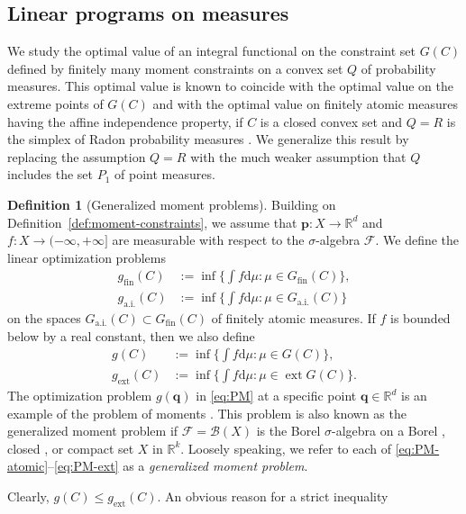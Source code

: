 \documentclass[a4paper,11pt,reqno]{amsart}
\numberwithin{equation}{section}
\theoremstyle{plain}
\theoremstyle{definition}
\newtheorem{definition}[theorem]{Definition}
\newcommand{\bp}{\mathbf{p}}
\newcommand{\bq}{\mathbf{q}}
\newcommand{\cB}{\mathcal{B}} %
\newcommand{\cF}{\mathcal{F}} %
\newcommand{\dd}{\mathrm{d}} %
\newcommand{\R}{\mathbb{R}} %
\DeclareMathOperator{\ext}{ext} %
\newcommand\ait{\mathrm{a.i.}}
\newcommand\extt{\mathrm{ext}}
\newcommand\fint{\mathrm{fin}}
\begin{document}
\subsection{Linear programs on measures}
\label{sec:measure-lp}
% 
We study the optimal value of an integral functional on the constraint set $G(C)$ 
defined by finitely many moment constraints on a convex set $Q$ of probability 
measures. This optimal value is known to coincide with the optimal value on the 
extreme points of $G(C)$ and with the optimal value on finitely atomic measures 
having the affine independence property, if $C$ is a closed convex set and $Q=R$ 
is the simplex of Radon probability measures \cite{weizsaecker-winkler80,winkler88}. 
We generalize this result by replacing the assumption $Q=R$ with the much weaker
assumption that $Q$ includes the set $P_1$ of point measures.
\par
%
\begin{definition}[Generalized moment problems]\label{def:moment-problems}
Building on Definition~\ref{def:moment-constraints}, we assume that $\bp\colon X\to\R^d$ 
and $f\colon X\to(-\infty,+\infty]$ are measurable with respect to the $\sigma$-algebra 
$\cF$. We define the linear optimization problems
\begin{align}
\label{eq:PM-atomic}
g_\fint(C) & \textstyle
:= \inf\{ \int f\dd\mu : \mu\in G_\fint(C) \},\\
%
\label{eq:PM-aff-ind}
g_\ait(C) & \textstyle
:= \inf\{ \int f\dd\mu : \mu\in G_\ait(C) \}
\end{align}
on the spaces $G_\ait(C)\subset G_\fint(C)$ of finitely atomic measures. If $f$ is 
bounded below by a real constant, then we also define
\begin{align}
\label{eq:PM}
g(C) & \textstyle
:= \inf\{ \int f\dd\mu : \mu\in G(C) \},\\
%
\label{eq:PM-ext}
g_\extt(C) & \textstyle
:= \inf\{ \int f\dd\mu : \mu\in \ext G(C) \}.
\end{align}
The optimization problem $g(\bq)$ in \eqref{eq:PM} at a specific point $\bq\in\R^d$ 
is an example of the problem of moments \cite{shapiro01}. This problem is also known 
as the generalized moment problem if $\cF=\cB(X)$ is the Borel $\sigma$-algebra on a Borel 
\cite{lasserre10}, closed \cite{henrion-etal20}, or compact \cite{klerk-laurent19} set 
$X$ in $\R^k$. Loosely speaking, we refer to each of 
\eqref{eq:PM-atomic}--\eqref{eq:PM-ext} as a \emph{generalized moment problem}.
\end{definition}
%
Clearly, $g(C)\leq g_\extt(C)$. An obvious reason for a strict inequality 
\end{document}
